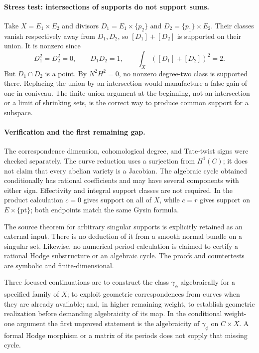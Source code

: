 \documentclass[11pt]{article}
\begin{document}
\paragraph{Stress test: intersections of supports do not support sums.}
Take $X=E_1\times E_2$ and divisors
 $D_1=E_1\times\{p_2\}$ and $D_2=\{p_1\}\times E_2$.
 Their classes vanish respectively away from $D_1,D_2$, so
 $[D_1]+[D_2]$ is supported on their union. It is nonzero since
\[
 D_1^2=D_2^2=0,\qquad D_1D_2=1,
 \qquad\int_X([D_1]+[D_2])^2=2.
\]
But $D_1\cap D_2$ is a point. By $N^2H^2=0$, no nonzero degree-two
 class is supported there. Replacing the union by an intersection would
 manufacture a false gain of one in coniveau. The finite-union argument
 at the beginning, not an intersection or a limit of shrinking sets,
 is the correct way to produce common support for a subspace.

\paragraph{Verification and the first remaining gap.}
The correspondence dimension, cohomological degree, and Tate-twist signs
 were checked separately. The curve reduction uses a surjection from
 $H^1(C)$; it does not claim that every abelian variety is a Jacobian.
 The algebraic cycle obtained conditionally has rational coefficients and
 may have several components with either sign. Effectivity and integral
 support classes are not required. In the product calculation $c=0$ gives
 support on all of $X$, while $c=r$ gives support on $E\times\{\mathrm{pt}\}$;
 both endpoints match the same Gysin formula.

The source theorem for arbitrary singular supports is explicitly retained
 as an external input. There is no deduction of it from a smooth normal
 bundle on a singular set. Likewise, no numerical period calculation is
 claimed to certify a rational Hodge substructure or an algebraic cycle.
 The proofs and countertests are symbolic and finite-dimensional.

Three focused continuations are to construct the class
 $\gamma_\phi$ algebraically for a specified family of $X$; to exploit
 geometric correspondences from curves when they are already available;
 and, in higher remaining weight, to establish geometric realization
 before demanding algebraicity of its map. In the conditional weight-one
 argument the first unproved statement is the algebraicity of
 $\gamma_\phi$ on $C\times X$. A formal Hodge morphism or a matrix of its
 periods does not supply that missing cycle.
\end{document}
